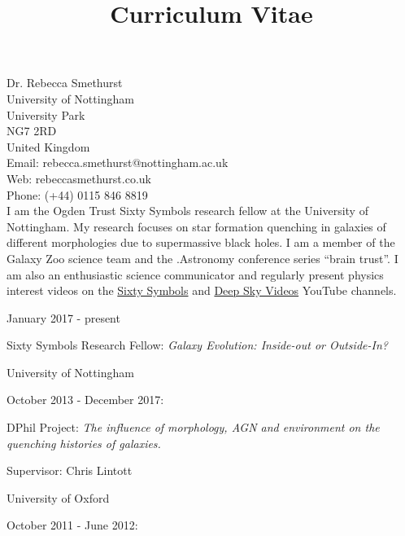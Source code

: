 \documentclass{article}
\begin{document}
\title{Curriculum Vitae\vspace{-7ex}}
\author{}
\date{}
\maketitle

{\center
Dr. Rebecca Smethurst\\
University of Nottingham \\
University Park \\
NG7 2RD \\
United Kingdom \\ 
\medskip
Email: rebecca.smethurst@nottingham.ac.uk \\
Web: rebeccasmethurst.co.uk \\
Phone: (+44) 0115 846 8819\\ 

}
\medskip
\noindent I am the Ogden Trust Sixty Symbols research fellow at the University of Nottingham. My research focuses on star formation quenching in galaxies of different morphologies due to supermassive black holes. I am a member of the Galaxy Zoo science team and the .Astronomy conference series ``brain trust''. I am also an enthusiastic science communicator and regularly present physics interest videos on the \href{https://www.youtube.com/user/sixtysymbols/search?query=smethurst}{Sixty Symbols} and \href{https://www.youtube.com/user/DeepSkyVideos/search?query=smethurst}{Deep Sky Videos} YouTube channels.

\noindent\makebox[\linewidth]{\rule{0.85\paperwidth}{0.2pt}}

\smallskip

\indent January 2017 - present

\indent\indent Sixty Symbols Research Fellow: \emph{Galaxy Evolution: Inside-out or Outside-In?}

\indent\indent\indent University of Nottingham

\smallskip

\indent October 2013 - December 2017:

\hangindent=15pt \indent\indent DPhil Project: \emph{The influence of morphology, AGN and environment on the quenching histories of galaxies.}

\indent\indent\indent Supervisor: Chris Lintott

\indent\indent\indent University of Oxford

\smallskip

\indent October 2011 - June 2012:
\end{document}
